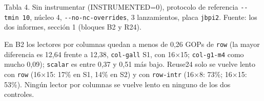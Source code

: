\begin{center}\footnotesize\setlength{\tabcolsep}{4pt}
\end{center}
{\footnotesize Tabla 4. Sin instrumentar (INSTRUMENTED=0), protocolo de referencia \texttt{-{}-tmin 10}, núcleo 4,
\texttt{-{}-no-nc-overrides}, 3 lanzamientos, placa \texttt{jbpi2}. Fuente: los dos informes, sección 1 (bloques B2 y R24).}

En B2 los lectores por columnas quedan a menos de 0,26 GOPs de \texttt{row} (la mayor diferencia es 12,64 frente a 12,38,
\texttt{col-gall} S1, con 16$\times$15; \texttt{col-g1-m4} como mucho 0,09); \texttt{scalar} es entre 0,37 y 0,51 más bajo. Reuse24
solo se vuelve lento con \texttt{row} (16$\times$15: 17\% en S1, 14\% en S2) y con \texttt{row-intr} (16$\times$8: 73\%;
16$\times$15: 53\%). Ningún lector por columnas se vuelve lento en ninguno de los dos controles.


